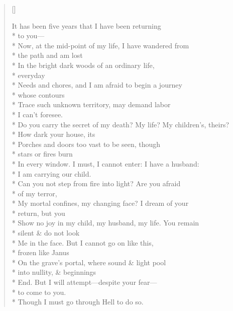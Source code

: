 \label{ch:inferno}
\settowidth{\versewidth}{Do you carry the secret of my death? My life? My children's, theirs?}
\begin{verse}[\versewidth]
\begin{altverse}
It has been five years that I have been returning\\*
to you---\\*
Now, at the mid-point of my life, I have wandered from\\*
the path and am lost\\*
In the bright dark woods of an ordinary life,\\*
everyday\\*
Needs and chores, and I am afraid to begin a journey\\*
whose contours\\*
Trace such unknown territory, may demand labor\\*
I can't foresee.\\*
Do you carry the secret of my death? My life? My children's, theirs?\\*
How dark your house, its\\*
Porches and doors too vast to be seen, though\\*
stars or fires burn\\*
In every window. I must, I cannot enter: I have a husband:\\*
I am carrying our child.\\*
Can you not step from fire into light? Are you afraid\\*
of my terror,\\*
My mortal confines, my changing face? I dream of your\\*
return, but you\\*
Show no joy in my child, my husband, my life. You remain\\*
silent \& do not look\\*
Me in the face. But I cannot go on like this,\\*
frozen like Janus\\*
On the grave's portal, where sound \& light pool\\*
into nullity, \& beginnings\\*
End. But I will attempt---despite your fear---\\*
to come to you.\\*
Though I must go through Hell to do so.
\end{altverse}
\end{verse}
